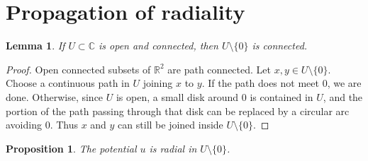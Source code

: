 \documentclass[11pt]{amsart}
\newtheorem{proposition}[theorem]{Proposition}
\newtheorem{lemma}[theorem]{Lemma}
\theoremstyle{remark}
\newcommand{\C}{\mathbb C}
\newcommand{\R}{\mathbb R}
\newcommand{\1}{\mathbf 1}
\begin{document}
\section{Propagation of radiality}

\begin{lemma}\label{lem:remove-point}
If $U\subset\C$ is open and connected, then $U\setminus\{0\}$ is connected.
\end{lemma}

\begin{proof}
Open connected subsets of $\R^2$ are path connected. Let $x,y\in U\setminus\{0\}$. Choose a continuous path in $U$ joining $x$ to $y$. If the path does not meet $0$, we are done. Otherwise, since $U$ is open, a small disk around $0$ is contained in $U$, and the portion of the path passing through that disk can be replaced by a circular arc avoiding $0$. Thus $x$ and $y$ can still be joined inside $U\setminus\{0\}$.
\end{proof}

\begin{proposition}\label{prop:u-radial}
The potential $u$ is radial in $U\setminus\{0\}$.
\end{proposition}
\end{document}
